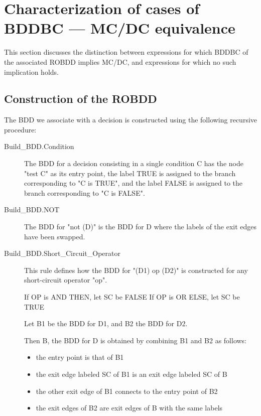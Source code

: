 \documentclass[a4paper,12pt,twoside]{article}
\begin{document}
\section{Characterization of cases of BDDBC --- MC/DC equivalence}

This section discusses the distinction between expressions for which
BDDBC of the associated ROBDD implies MC/DC, and expressions for which
no such implication holds.

\subsection{Construction of the ROBDD}

The BDD we associate with a decision is constructed using the following
recursive procedure:

\begin{description}
\item[Build\_BDD.Condition]
  The BDD for a decision consisting in a single condition C has the node
  "test C" as its entry point, the label TRUE is assigned to the branch
  corresponding to "C is TRUE", and the label FALSE is assigned to the
  branch corresponding to "C is FALSE".

\item[Build\_BDD.NOT]
  The BDD for "not (D)" is the BDD for D where the labels of the exit
  edges have been swapped.

\item[Build\_BDD.Short\_Circuit\_Operator]
  This rule defines how the BDD for "(D1) op (D2)" is constructed for
  any short-circuit operator "op".

  If OP is AND THEN, let SC be FALSE
  If OP is OR ELSE, let SC be TRUE

  Let B1 be the BDD for D1, and B2 the BDD for D2.

  Then B, the BDD for D is obtained by combining B1 and B2 as follows:
  \begin{itemize}
    \item the entry point is that of B1
    \item the exit edge labeled SC of B1 is an exit edge labeled SC of B
    \item the other exit edge of B1 connects to the entry point of B2
    \item the exit edges of B2 are exit edges of B with the same labels
  \end{itemize}
\end{description}
\end{document}
